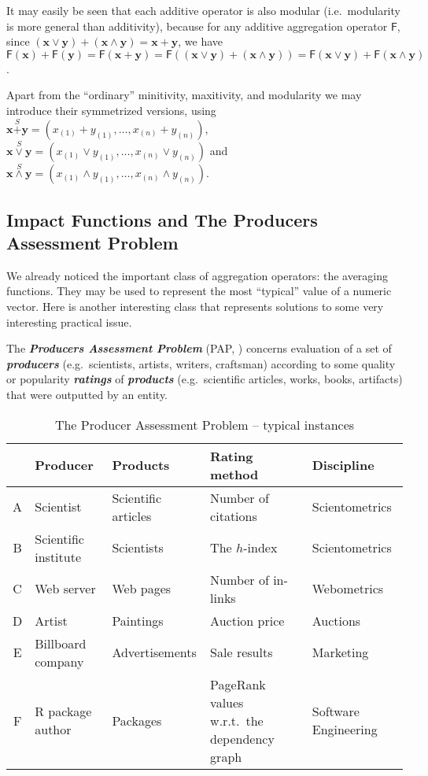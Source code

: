 \documentclass[11pt]{article}\usepackage[]{graphicx}\usepackage[]{color}
\renewcommand{\emph}[1]{\textbf{\textsl{#1}}}
\newcommand{\lang}[1]{\textsf{#1}\xspace}
\newcommand{\R}{\lang{R}}
\newcommand{\vect}[1]{{\mathbf{#1}}}
\newcommand{\func}[1]{{\mathsf{#1}}}
\theoremstyle{remark}
\theoremstyle{definition}
\begin{document}
It may easily be seen that each additive operator
is also modular
(i.e.~modularity is more general than additivity),
because for any additive aggregation operator $\func{F}$,
since
$(\vect{x}\vee\vect{y})+(\vect{x}\wedge\vect{y})=\vect{x}+\vect{y}$,
we have $\func{F}(\vect{x})+\func{F}(\vect{y})=\func{F}(\vect{x}+\vect{y})=
\func{F}((\vect{x}\vee\vect{y})+(\vect{x}\wedge\vect{y}))
=\func{F}(\vect{x}\vee\vect{y})+\func{F}(\vect{x}\wedge\vect{y})$.


\medskip
Apart from the ``ordinary'' minitivity, maxitivity, and modularity
we may introduce their symmetrized versions,
using $\vect{x}\stackrel{S}{+}\vect{y}
=(x_{(1)}+ y_{(1)},\dots,x_{(n)}+y_{(n)})$,
$\vect{x}\stackrel{S}{\vee}\vect{y}
=(x_{(1)}\vee y_{(1)},\dots,x_{(n)}\vee   y_{(n)})$
and
$\vect{x}\stackrel{S}{\wedge}\vect{y}
=(x_{(1)}\wedge y_{(1)},\dots,x_{(n)}\wedge y_{(n)})$.


\subsection{Impact Functions and The Producers Assessment Problem}

We already noticed the important class of aggregation operators:
the averaging functions. They may be used to represent the most ``typical''
value of a numeric vector.
Here is another interesting class
that represents solutions to some very interesting practical issue.

The \emph{Producers Assessment Problem} (PAP,
\cite{GagolewskiGrzegorzewski2011:ijar}) concerns evaluation of a set of
\emph{producers} (e.g.~scientists, artists, writers, craftsman)
according to some quality or popularity \emph{ratings}
of \emph{products}
(e.g.~scientific articles, works, books, artifacts) that
were outputted by an entity.


\begin{table}[ht]
\centering
\caption{\label{Table:InstancesPAP} The Producer
Assessment Problem -- typical instances}

\noindent\footnotesize
\begin{tabular}{|c||llp{3.5cm}p{3.2cm}|}
\hline
& Producer & Products & Rating method & Discipline \\
\hline\hline
A & Scientist & Scientific articles & Number of citations & Scientometrics \\
\hline
B & Scientific institute & Scientists & The $h$-index & Scientometrics     \\
\hline
C & Web server & Web pages & Number of in-links & Webometrics   \\
\hline
D & Artist   & Paintings  & Auction price & Auctions \\
\hline
E & Billboard company & Advertisements & Sale results & Marketing \\
\hline
F & \R{} package author & Packages & PageRank values w.r.t.~the dependency graph & Software Engineering\\
\hline
\end{tabular}
\end{table}
\end{document}
